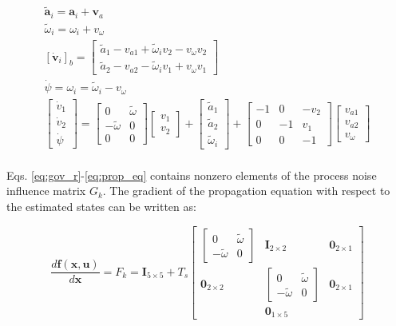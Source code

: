 \documentclass{aiaa-tc}
\newcommand{\br}[2]{[#1]_{#2}} %
\newcommand{\B}[1]{\textbf{#1}} %
\newcommand{\ddarg}[2]{\frac{d#1}{d#2}} %
\begin{document}
\begin{align}
\tilde{\B{a}}_i = \B{a}_i + \B{v}_a \\
\tilde{\omega}_i = \omega_i + v_\omega \\
\br{\dot{\B{v}}_i}{b} = \begin{bmatrix}
\tilde{a}_1 - v_{a1} + \tilde{\omega}_i v_{2} -  v_\omega v_2\\
\tilde{a}_2 - v_{a2} - \tilde{\omega}_i v_1 + v_\omega v_1
\end{bmatrix} \\
\dot{\psi} = \omega_i = \tilde{\omega}_i - v_\omega \\
\begin{bmatrix}
\dot{v}_1 \\ \dot{v}_2 \\ \dot{\psi}
\end{bmatrix}= \begin{bmatrix}
0 & \tilde{\omega} \\ -\tilde{\omega} & 0 \\ 0 & 0
\end{bmatrix} \begin{bmatrix}
v_1\\ v_2
\end{bmatrix} + \begin{bmatrix}
\tilde{a}_1 \\ \tilde{a}_2 \\ \tilde{\omega}_i
\end{bmatrix} + \begin{bmatrix}
-1 & 0 & -v_2 \\
0 & -1 & v_1 \\
0 & 0 & -1
\end{bmatrix} \begin{bmatrix}
v_{a1} \\ v_{a2} \\ v_\omega
\end{bmatrix} \label{eq:prop_eq} \\
\end{align}

Eqs. \ref{eq:gov_r}-\ref{eq:prop_eq} contains nonzero elements of the process noise influence matrix $G_k$. The gradient of the propagation equation with respect to the estimated states can be written as:

\begin{equation}
\ddarg{\B{f}(\B{x},\B{u})}{\B{x}} = F_k = \B{I}_{5\times 5} + T_s\begin{bmatrix}
\begin{bmatrix}
0 & \tilde{\omega} \\ -\tilde{\omega} & 0
\end{bmatrix} & \B{I}_{2\times 2} & \B{0}_{2\times 1} \\
\B{0}_{2\times 2} & \begin{bmatrix}
0 & \tilde{\omega} \\ -\tilde{\omega} & 0
\end{bmatrix} & \B{0}_{2\times 1} \\
& \B{0}_{1 \times 5} &
\end{bmatrix}
\end{equation}
\end{document}
